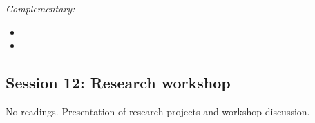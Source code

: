 \documentclass[12pt, a4paper]{article}
\begin{document}
\noindent\textit{Complementary:}

\begin{itemize}
  \item
  \item
\end{itemize}

\hline
\subsection*{Session 12: Research workshop}

No readings. Presentation of research projects and workshop discussion.
\end{document}
